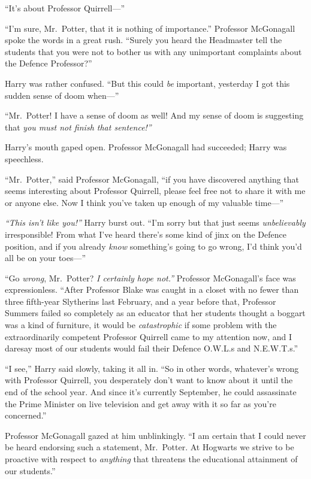 ``It's about Professor Quirrell---''

``I'm sure, Mr.~Potter, that it is nothing of importance.'' Professor
McGonagall spoke the words in a great rush. ``Surely you heard the
Headmaster tell the students that you were not to bother us with any
unimportant complaints about the Defence Professor?''

Harry was rather confused. ``But this could \emph{be} important,
yesterday I got this sudden sense of doom when---''

``Mr.~Potter! I have a sense of doom as well! And my sense of doom is
suggesting that \emph{you must not finish that sentence!''}

Harry's mouth gaped open. Professor McGonagall had succeeded; Harry was
speechless.

``Mr.~Potter,'' said Professor McGonagall, ``if you have discovered
anything that seems interesting about Professor Quirrell, please feel
free not to share it with me or anyone else. Now I think you've taken up
enough of my valuable time---''

\emph{``This isn't like you!''} Harry burst out. ``I'm sorry but that
just seems \emph{unbelievably} irresponsible! From what I've heard
there's some kind of jinx on the Defence position, and if you already
\emph{know} something's going to go wrong, I'd think you'd all be on
your toes---''

``Go \emph{wrong}, Mr.~Potter? \emph{I certainly hope not.''} Professor
McGonagall's face was expressionless. ``After Professor Blake was caught
in a closet with no fewer than three fifth-year Slytherins last
February, and a year before that, Professor Summers failed so completely
as an educator that her students thought a boggart was a kind of
furniture, it would be \emph{catastrophic} if some problem with the
extraordinarily competent Professor Quirrell came to my attention now,
and I daresay most of our students would fail their Defence O.W.L.s and
N.E.W.T.s.''

``I see,'' Harry said slowly, taking it all in. ``So in other words,
whatever's wrong with Professor Quirrell, you desperately don't want to
know about it until the end of the school year. And since it's currently
September, he could assassinate the Prime Minister on live television
and get away with it so far as you're concerned.''

Professor McGonagall gazed at him unblinkingly. ``I am certain that I
could never be heard endorsing such a statement, Mr.~Potter. At Hogwarts
we strive to be proactive with respect to \emph{anything} that threatens
the educational attainment of our students.''

